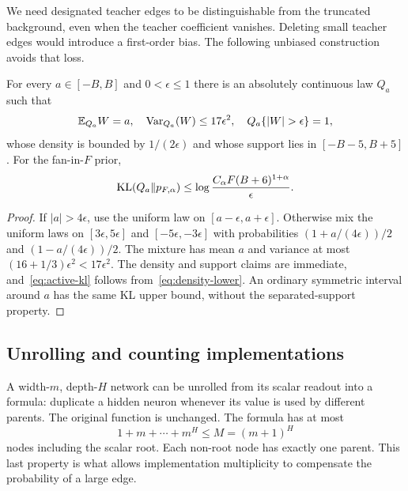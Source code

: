 We need designated teacher edges to be distinguishable from the truncated background, even when the teacher coefficient vanishes. Deleting small teacher edges would introduce a first-order bias. The following unbiased construction avoids that loss.

\begin{lemma}\label{lem:active}
For every $a\in[-B,B]$ and $0<\epsilon\le1$ there is an absolutely continuous law $Q_a$ such that
\begin{equation}
 \E_{Q_a}W=a,\quad \operatorname{Var}_{Q_a}(W)\le17\epsilon^2,
 \quad Q_a\{|W|>\epsilon\}=1,
 \label{eq:active-properties}
\end{equation}
whose density is bounded by $1/(2\epsilon)$ and whose support lies in $[-B-5,B+5]$. For the fan-in-$F$ prior,
\begin{equation}
 \operatorname{KL}(Q_a\|p_{F,\alpha})\le
 \log\frac{C_\alpha F(B+6)^{1+\alpha}}\epsilon.
 \label{eq:active-kl}
\end{equation}
\end{lemma}
\begin{proof}
If $|a|>4\epsilon$, use the uniform law on $[a-\epsilon,a+\epsilon]$. Otherwise mix the uniform laws on $[3\epsilon,5\epsilon]$ and $[-5\epsilon,-3\epsilon]$ with probabilities $(1+a/(4\epsilon))/2$ and $(1-a/(4\epsilon))/2$. The mixture has mean $a$ and variance at most $(16+1/3)\epsilon^2<17\epsilon^2$. The density and support claims are immediate, and~\eqref{eq:active-kl} follows from~\eqref{eq:density-lower}. An ordinary symmetric interval around $a$ has the same KL upper bound, without the separated-support property.
\end{proof}

\subsection{Unrolling and counting implementations}
A width-$m$, depth-$H$ network can be unrolled from its scalar readout into a formula: duplicate a hidden neuron whenever its value is used by different parents. The original function is unchanged. The formula has at most
\[
 1+m+\cdots+m^H\le M=(m+1)^H
\]
nodes including the scalar root. Each non-root node has exactly one parent. This last property is what allows implementation multiplicity to compensate the probability of a large edge.

